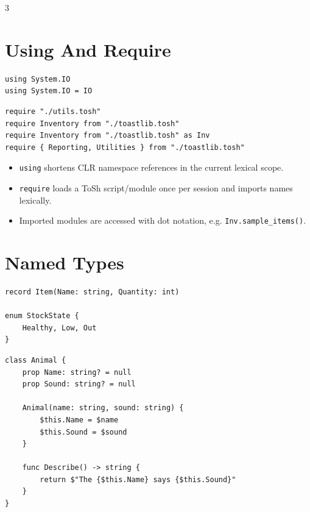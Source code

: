 


\footnotesize
{}

\begin{multicols*}{3}

\section{Using And Require}
\begin{lstlisting}
using System.IO
using System.IO = IO
\end{lstlisting}

\begin{lstlisting}
require "./utils.tosh"
require Inventory from "./toastlib.tosh"
require Inventory from "./toastlib.tosh" as Inv
require { Reporting, Utilities } from "./toastlib.tosh"
\end{lstlisting}

\begin{itemize}
\item \texttt{using} shortens CLR namespace references in the current lexical scope.
\item \texttt{require} loads a ToSh script/module once per session and imports names lexically.
\item Imported modules are accessed with dot notation, e.g. \texttt{Inv.sample\_items()}.
\end{itemize}

\section{Named Types}
\begin{lstlisting}
record Item(Name: string, Quantity: int)

enum StockState {
    Healthy, Low, Out
}
\end{lstlisting}

\begin{lstlisting}
class Animal {
    prop Name: string? = null
    prop Sound: string? = null

    Animal(name: string, sound: string) {
        $this.Name = $name
        $this.Sound = $sound
    }

    func Describe() -> string {
        return $"The {$this.Name} says {$this.Sound}"
    }
}
\end{lstlisting}



\end{multicols*}
